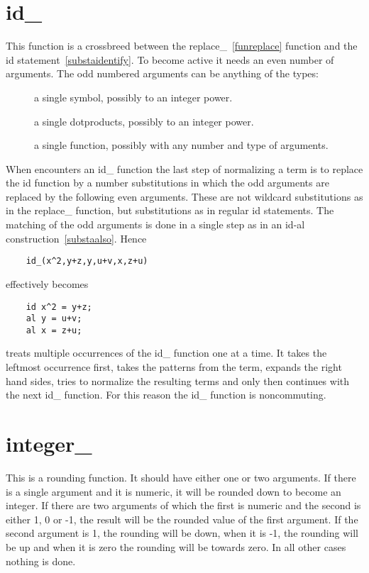 \section{id\_}
\label{funid}
\noindent This function is a crossbreed between the 
replace\_~\ref{funreplace} function and the id 
statement~\ref{substaidentify}. To become active it 
needs an even number of arguments. The odd numbered arguments can be 
anything of the types:
\begin{description}
\item[] a single symbol, possibly to an integer power.
\item[] a single dotproducts, possibly to an integer power.
\item[] a single function, possibly with any number and type of arguments.
\end{description}
When \FORM{} encounters an id\_ function the last step of normalizing a term 
is to replace the id function by a number substitutions in which the odd 
arguments are replaced by the following even arguments. These are not 
wildcard substitutions as in the replace\_ function, but substitutions as 
in regular id statements. The matching of the odd arguments is done in a 
single step as in an id-al construction~\ref{substaalso}. Hence
\begin{verbatim}
    id_(x^2,y+z,y,u+v,x,z+u)
\end{verbatim}
effectively becomes
\begin{verbatim}
    id x^2 = y+z;
    al y = u+v;
    al x = z+u;
\end{verbatim}
\FORM{} treats multiple occurrences of the id\_ function one at a time. It 
takes the leftmost occurrence first, takes the patterns from the term, 
expands the right hand sides, tries to normalize the resulting terms and 
only then continues with the next id\_ function. For this reason the id\_ 
function is noncommuting.


\section{integer\_}
\label{funinteger}
\noindent This is a rounding function. It should have 
either one or two arguments. If there is a single argument and it is 
numeric, it will be rounded down to become an integer. If there are two 
arguments of which the first is numeric and the second is either 1, 0 or 
-1, the result will be the rounded value of the first argument. If the 
second argument is 1, the rounding will be down, when it is -1, the 
rounding will be up and when it is zero the rounding will be towards zero. 
In all other cases nothing is done.

